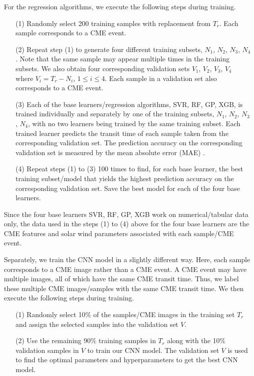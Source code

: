 \documentclass{article}
\begin{document}
For the regression algorithms, we execute the following steps during training.
\begin{enumerate}
\item[(1)]
Randomly select 200 training samples with replacement 
from $T_{r}$.
Each sample corresponds to a CME event.
\item[(2)]
Repeat step (1) to generate four different training subsets,
$N_{1}$, $N_{2}$, $N_{3}$, $N_{4}$.
Note that the same sample may appear multiple times in
the training subsets.
We also obtain four corresponding validation sets $V_{1}$, $V_{2}$, $V_{3}$, $V_{4}$
where $V_{i} = T_{r} - N_{i}$, $1 \leq i \leq 4$.
Each sample in a validation set also corresponds to a CME event.
\item[(3)]
Each of the base learners/regression algorithms, SVR, RF, GP, XGB, is trained 
individually and separately
by one of the training subsets,
$N_{1}$, $N_{2}$, $N_{3}$, $N_{4}$,
with no two learners being trained by the same training subset.
Each trained learner predicts the transit time
of each sample taken from the corresponding validation set.
The prediction accuracy on the corresponding validation set is measured by
the mean absolute error (MAE)
\citep{DBLP:journals/siamrev/Berk92}.
\item[(4)]
Repeat steps (1) to (3) 100 times to find,
for each base learner,
the best training subset/model 
that yields the highest prediction accuracy on the corresponding validation set.
Save the best model for each of the four base learners.
\end{enumerate}
Since the four base learners SVR, RF, GP, XGB work on 
numerical/tabular data only, 
the data used in the steps (1) to (4) above
for the four base learners
are the CME features and solar wind parameters 
associated with each sample/CME event.

Separately, we train the CNN model in a slightly different way.
Here, each sample corresponds to a CME image rather than a CME event.
A CME event may have multiple images, all of which have the same CME transit time.
Thus, we label these multiple CME images/samples with the same CME transit time.
We then execute the following steps during training.
\begin{enumerate}
\item[(1)] 
Randomly select 10\% of the samples/CME images in the training set $T_{r}$ and
assign the selected samples into the validation set $V$.
\item[(2)]
Use the remaining 90\% training samples in $T_{r}$ along with the 10\% validation samples in $V$ 
to train our CNN model. The validation set $V$ is used to find the optimal parameters and hyperparameters 
to get the best CNN model.
\end{enumerate}
\end{document}
